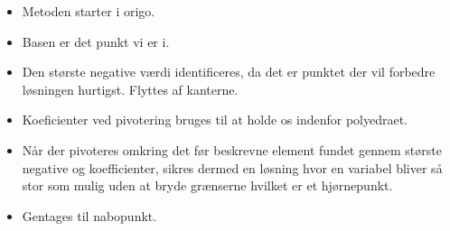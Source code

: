 \begin{frame}
\begin{itemize}


\item Metoden starter i origo.
\item Basen er det punkt vi er i.
\item Den største negative værdi identificeres, da det er punktet der vil forbedre løsningen hurtigst. Flyttes af kanterne. 
\item Koeficienter ved pivotering bruges til at holde os indenfor polyedraet.
\item Når der pivoteres omkring det før beskrevne element fundet gennem største negative og koefficienter, sikres dermed en løsning hvor en variabel bliver så stor som mulig uden at bryde grænserne hvilket er et hjørnepunkt.
\item Gentages til nabopunkt.
\end{itemize}
\end{frame}



